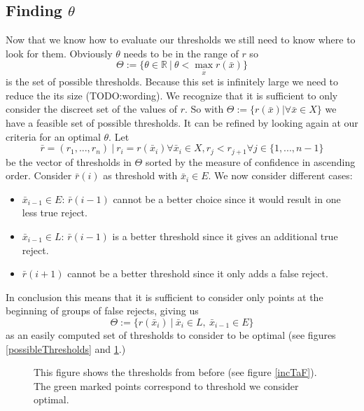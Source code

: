 \subsection{Finding $\theta$}
\label{findt}
Now that we know how to evaluate our thresholds we still need to know where to look for them. Obviously $\theta$ needs to be in the range of $r$ so
$$ \Theta := \{\theta \in \mathbb{R} \ | \ \theta < \operatorname*{max}_{\bar{x}} r(\bar{x})\}  $$
is the set of possible thresholds. Because this set is infinitely large we need to reduce the its size (TODO:wording). We recognize that it is sufficient to only consider the discreet set of the values of $r$. So with $\Theta := \{r(\bar{x}) | \forall \bar{x} \in X\}$ we have a feasible set of possible thresholds. It can be refined by looking again at our criteria for an optimal $\theta$. Let 
$$ \bar{r} = (r_1,...,r_n) \ | \ r_i = r(\bar{x}_i) \forall \bar{x}_i \in X, r_j < r_{j+1} \forall j \in \{1,...,n-1\} $$ 
be the vector of thresholds in $\Theta$ sorted by the measure of confidence in ascending order. Consider $\bar{r}(i)$ as threshold with $\bar{x}_i \in E$. We now consider different cases:
\begin{itemize}
	\item $\bar{x}_{i-1} \in E$: $\bar{r}(i-1)$ cannot be a better choice since it would result in one less true reject.
	\item $\bar{x}_{i-1} \in L$: $\bar{r}(i-1)$ is a better threshold since it gives an additional true reject.
	\item $\bar{r}(i+1)$ cannot be a better threshold since it only adds a false reject.
\end{itemize}
In conclusion this means that it is sufficient to consider only points at the beginning of groups of false rejects, giving us
$$ \Theta := \{r(\bar{x}_i) \ | \ \bar{x}_i \in L, \ \bar{x}_{i-1} \in E\} $$
as an easily computed set of thresholds to consider to be optimal (see figures \ref{possibleThresholds} and \ref{paretoFront}.)

\begin{figure}[!htbp]
\centering
\caption{This figure shows the thresholds from before (see figure \ref{incTaF}). The green marked points correspond to threshold we consider optimal.}
\label{paretoFront}
\end{figure}

